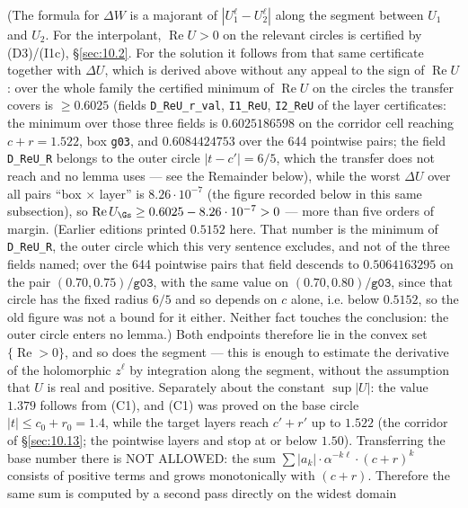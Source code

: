 (The formula for $\Delta W$ is a majorant of $|U_{1}^{\ell}-U_{2}^{\ell}|$ along the segment between $U_{1}$ and $U_{2}$.
For the interpolant, $\operatorname{Re} U > 0$ on the relevant circles is certified by (D3)/(I1c), \S\ref{sec:10.2}.
For the solution it follows from that same certificate together with $\Delta U$, which is derived
above without any appeal to the sign of $\operatorname{Re} U$: over the whole family the certified
minimum of $\operatorname{Re} U$ on the circles the transfer covers is $\ge 0.6025$ (fields \texttt{D\_\allowbreak ReU\_\allowbreak r\_\allowbreak val}, \texttt{I1\_\allowbreak ReU}, \texttt{I2\_\allowbreak ReU} of the layer certificates: the minimum over those three fields is $0.6025186598$ on the corridor cell reaching $c+r = 1.522$, box \texttt{g03}, and $0.6084424753$ over the 644 pointwise pairs; the field \texttt{D\_\allowbreak ReU\_\allowbreak R} belongs to the
outer circle $|t-c'| = 6/5$, which the transfer does not reach and no lemma
uses --- see the Remainder below), while the worst $\Delta U$ over all pairs ``box $\times$ layer'' is $8.26\cdot 10^{-7}$
(the figure recorded below in this same subsection), so
$\operatorname{Re} U_{\Gs} \ge 0.6025 - 8.26\cdot 10^{-7} > 0$ --- more than five orders of margin. (Earlier editions printed $0.5152$ here. That number is the minimum of \texttt{D\_\allowbreak ReU\_\allowbreak R}, the outer circle which this very sentence excludes, and not of the three fields named; over the 644 pointwise pairs that field descends to $0.5064163295$ on the pair $(0.70,0.75)/\texttt{g03}$, with the same value on $(0.70,0.80)/\texttt{g03}$, since that circle has the fixed radius $6/5$ and so depends on $c$ alone, i.e. below $0.5152$, so the old figure was not a bound for it either. Neither fact touches the conclusion: the outer circle enters no lemma.)
Both endpoints therefore lie in the convex set
$\{\operatorname{Re}>0\}$, and so does the segment --- this is enough to estimate
the derivative of the holomorphic $z^{\ell}$ by integration along the segment, without the assumption
that $U$ is real and positive. Separately about the constant $\sup|U|$: the value $1.379$ follows from
(C1), and (C1) was proved on the base circle $|t|\le c_{0}+r_{0}=1.4$, while the target layers reach
$c'+r'$ up to $1.522$ (the corridor of \S\ref{sec:10.13}; the pointwise layers and \Qcell{} stop at or below $1.50$).
Transferring the base number there is NOT ALLOWED: the sum
$\sum|a_{k}|\cdot \alpha^{-k\ell}\cdot (c+r)^{k}$ consists of positive terms and grows monotonically with $(c+r)$.
Therefore the same sum is computed by a second pass directly on the widest domain
